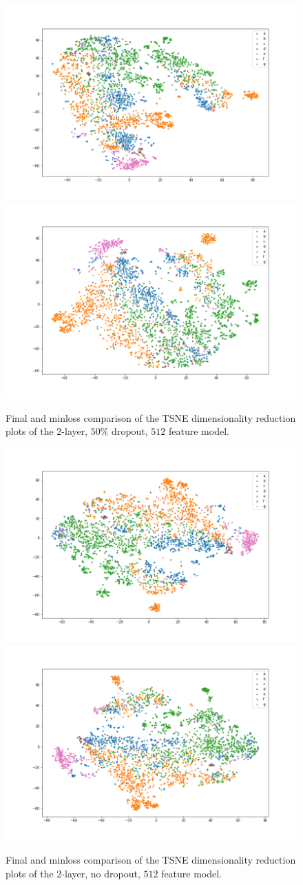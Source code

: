 
\begin{figure}[!ht]
  \centering
  \includegraphics[width=0.49\linewidth]{latex/imgs/tsne_2_layer_05_drop_final.png}
  \includegraphics[width=0.49\linewidth]{latex/imgs/tsne_2_layer_05_drop_minloss.png}
  \caption{Final and minloss comparison of the TSNE dimensionality reduction plots of the 2-layer, $50\%$ dropout, $512$ feature model.}
\end{figure}
\begin{figure}[!ht]
  \includegraphics[width=0.49\linewidth]{latex/imgs/tsne_2_layer_no_drop_final.png}
  \includegraphics[width=0.49\linewidth]{latex/imgs/tsne_2_layer_no_drop_minloss.png}
  \caption{Final and minloss comparison of the TSNE dimensionality reduction plots of the 2-layer, no dropout, $512$ feature model.}
\end{figure}
